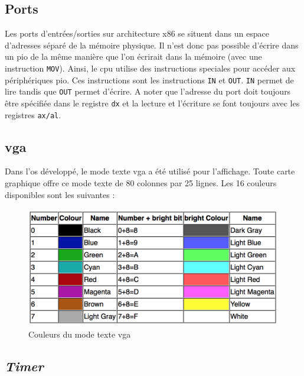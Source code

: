 \documentclass[a4paper, 12pt]{article}
\begin{document}
\subsection{Ports}
Les ports d'entrées/sorties sur architecture x86 se situent dans un espace d'adresses
séparé de la mémoire physique. Il n'est donc pas possible d'écrire dans un \acrshort{pio}
de la même manière que l'on écrirait dans la mémoire (avec une instruction 
\texttt{MOV}). Ainsi, le \acrshort{cpu} utilise des instructions speciales
pour accéder aux périphériques \acrshort{pio}. Ces instructions sont les instructions
\texttt{IN} et \texttt{OUT}. \texttt{IN} permet de lire
tandis que \texttt{OUT} permet d'écrire. A noter que l'adresse du port
doit toujours être spécifiée dans le registre \texttt{dx} et la lecture
et l'écriture se font toujours avec les registres \texttt{ax/al}.\cite{ref42}


\subsection{\acrshort{vga}}
Dans l'\acrshort{os} développé, le mode texte \acrshort{vga} a été utilisé pour
l'affichage. Toute carte graphique offre ce mode texte de 80 colonnes par 25 lignes.
Les 16 couleurs disponibles sont les suivantes :\cite{ref19}
\begin{figure}[!h]
  \centering
  \includegraphics[scale=0.7]{images/colors.png}
  \caption{Couleurs du mode texte \acrshort{vga}}
\end{figure}


\subsection{\textit{Timer}}
\end{document}
